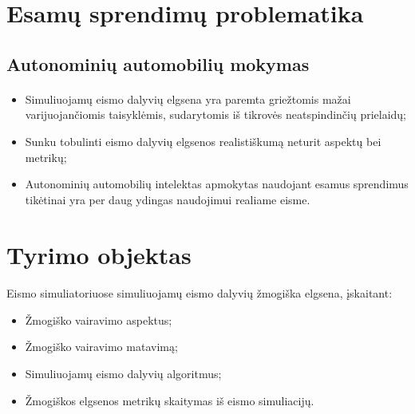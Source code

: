 \documentclass{beamer}
\begin{document}
\section{Esamų sprendimų problematika}

\subsection{\normalsize{Autonominių automobilių mokymas}}
\begin{frame}{\insertsection}
\framesubtitle{\insertsubsection}
\begin{itemize}
	\item Simuliuojamų eismo dalyvių elgsena yra paremta griežtomis mažai varijuojančiomis taisyklėmis, sudarytomis iš tikrovės neatspindinčių prielaidų;
	\item Sunku tobulinti eismo dalyvių elgsenos realistiškumą neturit aspektų bei metrikų;
	\item Autonominių automobilių intelektas apmokytas naudojant esamus sprendimus tikėtinai yra per daug ydingas naudojimui realiame eisme.
\end{itemize}
\end{frame}



\section{Tyrimo objektas}


\begin{frame}{\insertsection}
\framesubtitle{\insertsubsection}
Eismo simuliatoriuose simuliuojamų eismo dalyvių žmogiška elgsena, įskaitant:
\begin{itemize}
	\item Žmogiško vairavimo aspektus;
	\item Žmogiško vairavimo matavimą;
	\item Simuliuojamų eismo dalyvių algoritmus;
	\item Žmogiškos elgsenos metrikų skaitymas iš eismo simuliacijų.
\end{itemize}
\end{frame}
\end{document}
